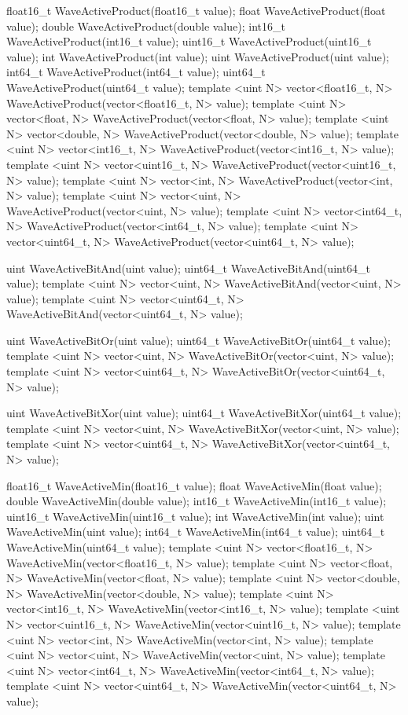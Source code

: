 \begin{HLSL}
float16_t WaveActiveProduct(float16_t value);
float WaveActiveProduct(float value);
double WaveActiveProduct(double value);
int16_t WaveActiveProduct(int16_t value);
uint16_t WaveActiveProduct(uint16_t value);
int WaveActiveProduct(int value);
uint WaveActiveProduct(uint value);
int64_t WaveActiveProduct(int64_t value);
uint64_t WaveActiveProduct(uint64_t value);
template <uint N> vector<float16_t, N> WaveActiveProduct(vector<float16_t, N> value);
template <uint N> vector<float, N> WaveActiveProduct(vector<float, N> value);
template <uint N> vector<double, N> WaveActiveProduct(vector<double, N> value);
template <uint N> vector<int16_t, N> WaveActiveProduct(vector<int16_t, N> value);
template <uint N> vector<uint16_t, N> WaveActiveProduct(vector<uint16_t, N> value);
template <uint N> vector<int, N> WaveActiveProduct(vector<int, N> value);
template <uint N> vector<uint, N> WaveActiveProduct(vector<uint, N> value);
template <uint N> vector<int64_t, N> WaveActiveProduct(vector<int64_t, N> value);
template <uint N> vector<uint64_t, N> WaveActiveProduct(vector<uint64_t, N> value);

uint WaveActiveBitAnd(uint value);
uint64_t WaveActiveBitAnd(uint64_t value);
template <uint N> vector<uint, N> WaveActiveBitAnd(vector<uint, N> value);
template <uint N> vector<uint64_t, N> WaveActiveBitAnd(vector<uint64_t, N> value);

uint WaveActiveBitOr(uint value);
uint64_t WaveActiveBitOr(uint64_t value);
template <uint N> vector<uint, N> WaveActiveBitOr(vector<uint, N> value);
template <uint N> vector<uint64_t, N> WaveActiveBitOr(vector<uint64_t, N> value);

uint WaveActiveBitXor(uint value);
uint64_t WaveActiveBitXor(uint64_t value);
template <uint N> vector<uint, N> WaveActiveBitXor(vector<uint, N> value);
template <uint N> vector<uint64_t, N> WaveActiveBitXor(vector<uint64_t, N> value);

float16_t WaveActiveMin(float16_t value);
float WaveActiveMin(float value);
double WaveActiveMin(double value);
int16_t WaveActiveMin(int16_t value);
uint16_t WaveActiveMin(uint16_t value);
int WaveActiveMin(int value);
uint WaveActiveMin(uint value);
int64_t WaveActiveMin(int64_t value);
uint64_t WaveActiveMin(uint64_t value);
template <uint N> vector<float16_t, N> WaveActiveMin(vector<float16_t, N> value);
template <uint N> vector<float, N> WaveActiveMin(vector<float, N> value);
template <uint N> vector<double, N> WaveActiveMin(vector<double, N> value);
template <uint N> vector<int16_t, N> WaveActiveMin(vector<int16_t, N> value);
template <uint N> vector<uint16_t, N> WaveActiveMin(vector<uint16_t, N> value);
template <uint N> vector<int, N> WaveActiveMin(vector<int, N> value);
template <uint N> vector<uint, N> WaveActiveMin(vector<uint, N> value);
template <uint N> vector<int64_t, N> WaveActiveMin(vector<int64_t, N> value);
template <uint N> vector<uint64_t, N> WaveActiveMin(vector<uint64_t, N> value);


\end{HLSL}

